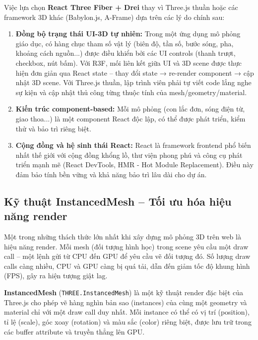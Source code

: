 Việc lựa chọn \textbf{React Three Fiber + Drei} thay vì Three.js thuần hoặc các framework 3D khác (Babylon.js, A-Frame) dựa trên các lý do chính sau:

\begin{enumerate}
    \item \textbf{Đồng bộ trạng thái UI-3D tự nhiên:} Trong một ứng dụng mô phỏng giáo dục, có hàng chục tham số vật lý (biên độ, tần số, bước sóng, pha, khoảng cách nguồn...) được điều khiển bởi các UI controls (thanh trượt, checkbox, nút bấm). Với R3F, mối liên kết giữa UI và 3D scene được thực hiện đơn giản qua React state – thay đổi state → re-render component → cập nhật 3D scene. Với Three.js thuần, lập trình viên phải tự viết code lắng nghe sự kiện và cập nhật thủ công từng thuộc tính của mesh/geometry/material.
    
    \item \textbf{Kiến trúc component-based:} Mỗi mô phỏng (con lắc đơn, sóng điện từ, giao thoa...) là một component React độc lập, có thể được phát triển, kiểm thử và bảo trì riêng biệt.
    \item \textbf{Cộng đồng và hệ sinh thái React:} React là framework frontend phổ biến nhất thế giới với cộng đồng khổng lồ, thư viện phong phú và công cụ phát triển mạnh mẽ (React DevTools, HMR - Hot Module Replacement). Điều này đảm bảo tính bền vững và khả năng bảo trì lâu dài cho dự án.
\end{enumerate}

\subsection{Kỹ thuật InstancedMesh – Tối ưu hóa hiệu năng render}

Một trong những thách thức lớn nhất khi xây dựng mô phỏng 3D trên web là hiệu năng render. Mỗi mesh (đối tượng hình học) trong scene yêu cầu một draw call – một lệnh gửi từ CPU đến GPU để yêu cầu vẽ đối tượng đó. Số lượng draw calls càng nhiều, CPU và GPU càng bị quá tải, dẫn đến giảm tốc độ khung hình (FPS), gây ra hiện tượng giật lag.

\textbf{InstancedMesh} (\texttt{THREE.InstancedMesh}) là một kỹ thuật render đặc biệt của Three.js cho phép vẽ hàng nghìn bản sao (instances) của cùng một geometry và material chỉ với một draw call duy nhất. Mỗi instance có thể có vị trí (position), tỉ lệ (scale), góc xoay (rotation) và màu sắc (color) riêng biệt, được lưu trữ trong các buffer attribute và truyền thẳng lên GPU.

